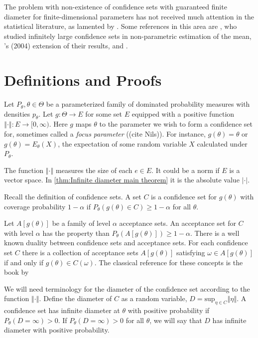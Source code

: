 \documentclass[twoside]{article}
\begin{document}
The problem with non-existence
of confidence sets with guaranteed finite diameter for finite-dimensional
parameters has not received much attention in the statistical literature,
as lamented by \citet{gleser996bootstrap}. Some references in this
area are \citet{bahadur1956nonexistence}, who studied infinitely
large confidence sets in non-parametric estimation of the mean, \citeauthor{romano2004non}'s
(2004) extension of their results, \citet{Donoho1988-hg} and \citet{Pfanzagl1998-fe}.

\section{Definitions and Proofs}
Let $P_{\theta},\theta\in\Theta$ be a parameterized family of dominated probability
measures with densities $p_{\theta}$. Let $g:\Theta\to E$ for some
set $E$ equipped with a positive function $\left\Vert \cdot\right\Vert :E\to[0,\infty)$.
Here $g$ maps $\theta$ to the parameter we wish to form a confidence
set for, sometimes called a \textit{focus parameter} ((cite Nils)). For instance, $g(\theta) = \theta$ or $g(\theta) = E_\theta(X)$, the expectation of some random variable $X$ calculated under $P_\theta$. 

The function $\left\Vert \cdot\right\Vert$ measures the size of each $e \in E$. It could be a norm if $E$ is a vector space. In \cref{thm:Infinite diameter main theorem} it is the absolute value $\left|\cdot\right|$. 

Recall the definition of confidence sets. A set $C$ is a confidence set for $g(\theta)$ with coverage probability $1-\alpha$
if $P_{\theta}(g(\theta)\in C)\geq1-\alpha$
for all $\theta$. 

Let ${A[g(\theta)]}$ be a family of level $\alpha$ acceptance sets. An acceptance set for $C$ with level $\alpha$ has the property than $P_{\theta}(A[g(\theta)])\geq1-\alpha$.
There is a well known duality between confidence sets and acceptance
sets. For each confidence set $C$ there is a collection of acceptance
sets $A[g(\theta)]$ satisfying $\omega\in A[g(\theta)]$ if and only if $g(\theta)\in C(\omega)$. The classical reference for these concepts is the book by \citet[Chapter 3.5]{lehmann2006testing}

We will need terminology for the diameter of the confidence set according
to the function $\left\Vert \cdot\right\Vert $. Define the diameter of $C$ as a random variable, $D=\textrm{sup}_{\eta\in C}\left\Vert \eta\right\Vert$.
A confidence set has infinite diameter at $\theta$ with positive
probability if $P_{\theta}(D=\infty)>0$. If $P_{\theta}(D=\infty)>0$
for all $\theta$, we will say that $D$ has infinite diameter with
positive probability.
\end{document}
